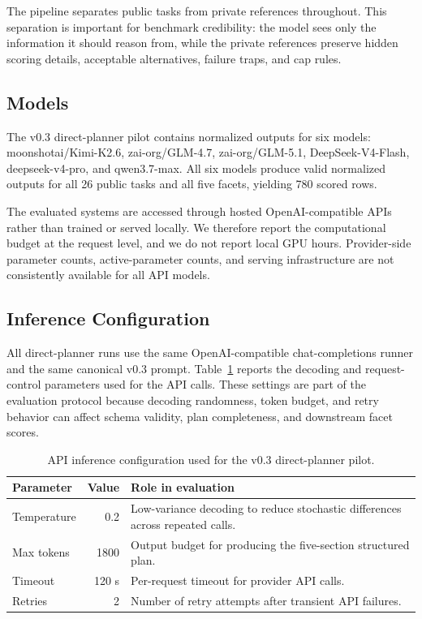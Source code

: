 \documentclass[11pt]{article}
\begin{document}
The pipeline separates public tasks from private references throughout. This separation is important for benchmark credibility: the model sees only the information it should reason from, while the private references preserve hidden scoring details, acceptable alternatives, failure traps, and cap rules.

\subsection{Models}

The v0.3 direct-planner pilot contains normalized outputs for six models: moonshotai/Kimi-K2.6, zai-org/GLM-4.7, zai-org/GLM-5.1, DeepSeek-V4-Flash, deepseek-v4-pro, and qwen3.7-max. All six models produce valid normalized outputs for all 26 public tasks and all five facets, yielding 780 scored rows.

The evaluated systems are accessed through hosted OpenAI-compatible APIs rather than trained or served locally. We therefore report the computational budget at the request level, and we do not report local GPU hours. Provider-side parameter counts, active-parameter counts, and serving infrastructure are not consistently available for all API models.

\subsection{Inference Configuration}

All direct-planner runs use the same OpenAI-compatible chat-completions runner and the same canonical v0.3 prompt. Table~\ref{tab:api-config} reports the decoding and request-control parameters used for the API calls. These settings are part of the evaluation protocol because decoding randomness, token budget, and retry behavior can affect schema validity, plan completeness, and downstream facet scores.

\begin{table}[t]
\caption{API inference configuration used for the v0.3 direct-planner pilot.}
\label{tab:api-config}
\centering
\small
\begin{tabularx}{\columnwidth}{l r X}
\toprule
\textbf{Parameter} & \textbf{Value} & \textbf{Role in evaluation} \\
\midrule
Temperature & 0.2 & Low-variance decoding to reduce stochastic differences across repeated calls. \\
Max tokens & 1800 & Output budget for producing the five-section structured plan. \\
Timeout & 120 s & Per-request timeout for provider API calls. \\
Retries & 2 & Number of retry attempts after transient API failures. \\
\bottomrule
\end{tabularx}
\end{table}
\end{document}
